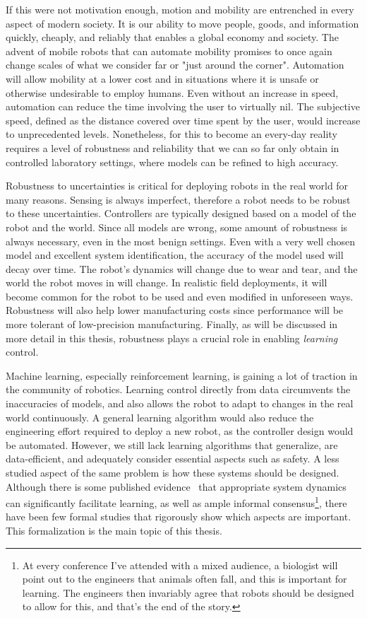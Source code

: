 If this were not motivation enough, motion and mobility are entrenched in every aspect of modern society. It is our ability to move people, goods, and information quickly, cheaply, and reliably that enables a global economy and society. The advent of mobile robots that can automate mobility promises to once again change scales of what we consider far or "just around the corner". Automation will allow mobility at a lower cost and in situations where it is unsafe or otherwise undesirable to employ humans. Even without an increase in speed, automation can reduce the time involving the user to virtually nil. The subjective speed, defined as the distance covered over time spent by the user, would increase to unprecedented levels. Nonetheless, for this to become an every-day reality requires a level of robustness and reliability that we can so far only obtain in controlled laboratory settings, where models can be refined to high accuracy. \par

Robustness to uncertainties is critical for deploying robots in the real world for many reasons.
Sensing is always imperfect, therefore a robot needs to be robust to these uncertainties.
Controllers are typically designed based on a model of the robot and the world. Since all models are wrong, some amount of robustness is always necessary, even in the most benign settings.
Even with a very well chosen model and excellent system identification, the accuracy of the model used will decay over time.
The robot's dynamics will change due to wear and tear, and the world the robot moves in will change.
In realistic field deployments, it will become common for the robot to be used and even modified in unforeseen ways.
Robustness will also help lower manufacturing costs since performance will be more tolerant of low-precision manufacturing.
Finally, as will be discussed in more detail in this thesis, robustness plays a crucial role in enabling \emph{learning} control.
\par
Machine learning, especially reinforcement learning, is gaining a lot of traction in the community of robotics. Learning control directly from data circumvents the inaccuracies of models, and also allows the robot to adapt to changes in the real world continuously.
A general learning algorithm would also reduce the engineering effort required to deploy a new robot, as the controller design would be automated.
However, we still lack learning algorithms that generalize, are data-efficient, and adequately consider essential aspects such as safety.
A less studied aspect of the same problem is how these systems should be designed. Although there is some published evidence~\cite{tedrake2005learning, randlov2000shaping} that appropriate system dynamics can significantly facilitate learning, as well as ample informal consensus\footnote{At every conference I've attended with a mixed audience, a biologist will point out to the engineers that animals often fall, and this is important for learning. The engineers then invariably agree that robots should be designed to allow for this, and that's the end of the story.}, there have been few formal studies that rigorously show which aspects are important. This formalization is the main topic of this thesis.

